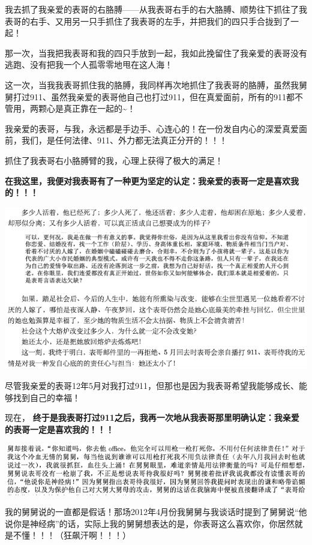 \documentclass[9pt, b5paper]{article}
\begin{document}
我去抓了我亲爱的表哥的右胳膊——从我表哥右手的右大胳膊、顺势往下抓往了我表哥的右手、又用另一只手抓住了我表哥的左手，并把我们的四只手合拢到了一起！

那一次，当我把我表哥和我的四只手放到一起，我如此挽留住了我亲爱的表哥没有逃跑、没有把我一个人孤零零地甩在这人海！

这一次，当我我表哥抓住我的胳膊，我同样再次地抓住了我表哥的胳膊，虽然我舅舅打过911、虽然我亲爱的表哥他自己也打过911，但在真爱面前，所有的911都不管用，两颗心是真正靠在一起的\textasciitilde{}！

我亲爱的表哥，与我，永远都是手边手、心连心的！在一份发自内心的深爱真爱面前，我们，是任何法律、911、外力都无法真正分开的！！！

抓住了我表哥右小胳膊臂的我，心理上获得了极大的满足！

\textbf{在我这里，我便对我表哥有了一种更为坚定的认定：我亲爱的表哥一定是喜欢我的！！！}

\begin{center}
\includegraphics[width=.9\linewidth]{./pic/backups_plans_20210506_202853.png}
\end{center}

尽管我亲爱的表哥12年5月对我打过911，但那也是因为我表哥希望我能够成长、能够找到自己的幸福！

现在， \textbf{终于是我表哥打过911之后，我再一次地从我表哥那里明确认定：我亲爱的表哥一定是喜欢我的！！！}

\begin{center}
\includegraphics[width=.9\linewidth]{./pic/backups_plans_20210506_111450.png}
\end{center}

我的舅舅说的一直都是假话！那场2012年4月份我舅舅与我谈话时提到了舅舅说“他说你是神经病”的话，实际上我的舅舅想表达的是，你表哥这么喜欢你，你居然就是不懂！！！（狂飙汗啊！！！）
\end{document}
